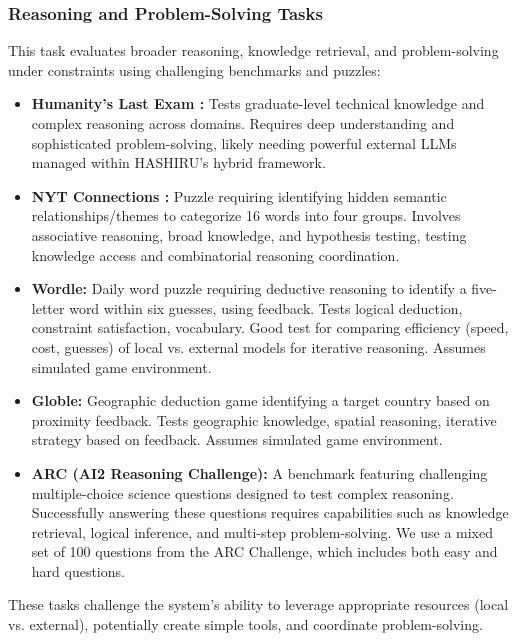 \documentclass[conference]{IEEEtran}
\begin{document}
\subsubsection{Reasoning and Problem-Solving Tasks}
This task evaluates broader reasoning, knowledge retrieval, and problem-solving under constraints using challenging benchmarks and puzzles:
\begin{itemize}
    \item \textbf{Humanity's Last Exam \cite{phan2025humanitysexam}:} Tests graduate-level technical knowledge and complex reasoning across domains. Requires deep understanding and sophisticated problem-solving, likely needing powerful external LLMs managed within HASHIRU's hybrid framework.
    \item \textbf{NYT Connections \cite{lopez2024nyt}:} Puzzle requiring identifying hidden semantic relationships/themes to categorize 16 words into four groups. Involves associative reasoning, broad knowledge, and hypothesis testing, testing knowledge access and combinatorial reasoning coordination.
    \item \textbf{Wordle:} Daily word puzzle requiring deductive reasoning to identify a five-letter word within six guesses, using feedback. Tests logical deduction, constraint satisfaction, vocabulary. Good test for comparing efficiency (speed, cost, guesses) of local vs. external models for iterative reasoning. Assumes simulated game environment.
    \item \textbf{Globle:} Geographic deduction game identifying a target country based on proximity feedback. Tests geographic knowledge, spatial reasoning, iterative strategy based on feedback. Assumes simulated game environment.
    \item \textbf{ARC (AI2 Reasoning Challenge)\cite{boratko2018systematic}:} A benchmark featuring challenging multiple-choice science questions designed to test complex reasoning. Successfully answering these questions requires capabilities such as knowledge retrieval, logical inference, and multi-step problem-solving.
    We use a mixed set of 100 questions from the ARC Challenge, which includes both easy and hard questions.
\end{itemize}
These tasks challenge the system's ability to leverage appropriate resources (local vs. external), potentially create simple tools, and coordinate problem-solving.
\end{document}
